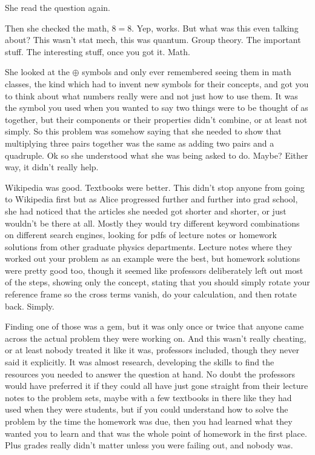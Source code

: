 \mypause 

She read the question again. 

\mypause
%

Then she checked the math, $8=8$. Yep, works. But what was this even talking about? This wasn't stat mech, this was quantum. Group theory. The important stuff. The interesting stuff, once you got it. Math. 

She looked at the $\oplus$ symbols and only ever remembered seeing them in math classes, the kind which had to invent new symbols for their concepts, and got you to think about what numbers really were and not just how to use them. It was the symbol you used when you wanted to say two things were to be thought of as together, but their components or their properties didn't combine, or at least not simply. So this problem was somehow saying that she needed to show that multiplying three pairs together was the same as adding two pairs and a quadruple. Ok so she understood what she was being asked to do. Maybe? Either way, it didn't really help.

Wikipedia was good. Textbooks were better. This didn't stop anyone from going to Wikipedia first but as Alice progressed further and further into grad school, she had noticed that the articles she needed got shorter and shorter, or just wouldn't be there at all. Mostly they would try different keyword combinations on different search engines, looking for pdfs of lecture notes or homework solutions from other graduate physics departments. Lecture notes where they worked out your problem as an example were the best, but homework solutions were pretty good too, though it seemed like professors deliberately left out most of the steps, showing only the concept, stating that you should simply rotate your reference frame so the cross terms vanish, do your calculation, and then rotate back. Simply.

Finding one of those was a gem, but it was only once or twice that anyone came across the actual problem they were working on. And this wasn't really cheating, or at least nobody treated it like it was, professors included, though they never said it explicitly. It was almost research, developing the skills to find the resources you needed to answer the question at hand. No doubt the professors would have preferred it if they could all have just gone straight from their lecture notes to the problem sets, maybe with a few textbooks in there like they had used when they were students, but if you could understand how to solve the problem by the time the homework was due, then you had learned what they wanted you to learn and that was the whole point of homework in the first place. Plus grades really didn't matter unless you were failing out, and nobody was.

